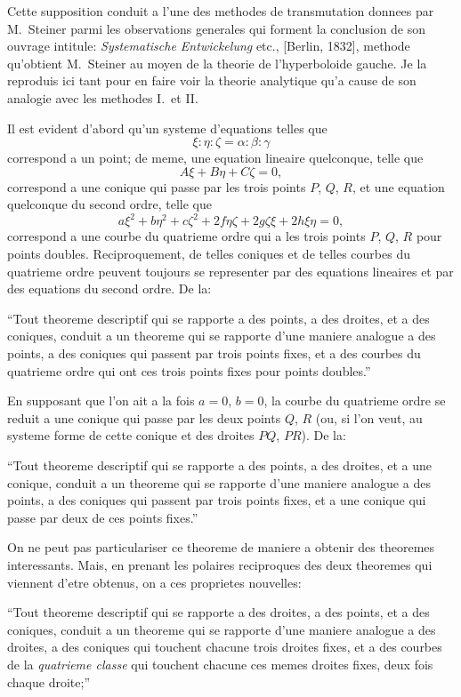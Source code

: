 \documentclass[11pt,a4paper]{book}
\begin{document}
Cette supposition conduit a l'une des methodes de transmutation donnees par M.~Steiner parmi les observations generales qui forment la conclusion de son ouvrage intitule: \textit{Systematische Entwickelung} etc., [Berlin, 1832], methode qu'obtient M.~Steiner au moyen de la theorie de l'hyperboloide gauche. Je la reproduis ici tant pour en faire voir la theorie analytique qu'a cause de son analogie avec les methodes I.\ et II.

Il est evident d'abord qu'un systeme d'equations telles que
\[
\xi : \eta : \zeta = \alpha : \beta : \gamma
\]
correspond a un point; de meme, une equation lineaire quelconque, telle que
\[
A\xi + B\eta + C\zeta = 0,
\]
correspond a une conique qui passe par les trois points $P$, $Q$, $R$, et une equation quelconque du second ordre, telle que
\[
a\xi^2 + b\eta^2 + c\zeta^2 + 2f\eta\zeta + 2g\zeta\xi + 2h\xi\eta = 0,
\]
correspond a une courbe du quatrieme ordre qui a les trois points $P$, $Q$, $R$ pour points doubles. Reciproquement, de telles coniques et de telles courbes du quatrieme ordre peuvent toujours se representer par des equations lineaires et par des equations du second ordre. De la:

``Tout theoreme descriptif qui se rapporte a des points, a des droites, et a des coniques, conduit a un theoreme qui se rapporte d'une maniere analogue a des points, a des coniques qui passent par trois points fixes, et a des courbes du quatrieme ordre qui ont ces trois points fixes pour points doubles.''

En supposant que l'on ait a la fois $a = 0$, $b = 0$, la courbe du quatrieme ordre se reduit a une conique qui passe par les deux points $Q$, $R$ (ou, si l'on veut, au systeme forme de cette conique et des droites $PQ$, $PR$). De la:

``Tout theoreme descriptif qui se rapporte a des points, a des droites, et a une conique, conduit a un theoreme qui se rapporte d'une maniere analogue a des points, a des coniques qui passent par trois points fixes, et a une conique qui passe par deux de ces points fixes.''

On ne peut pas particulariser ce theoreme de maniere a obtenir des theoremes interessants. Mais, en prenant les polaires reciproques des deux theoremes qui viennent d'etre obtenus, on a ces proprietes nouvelles:

``Tout theoreme descriptif qui se rapporte a des droites, a des points, et a des coniques, conduit a un theoreme qui se rapporte d'une maniere analogue a des droites, a des coniques qui touchent chacune trois droites fixes, et a des courbes de la \textit{quatrieme classe} qui touchent chacune ces memes droites fixes, deux fois chaque droite;''
\end{document}

